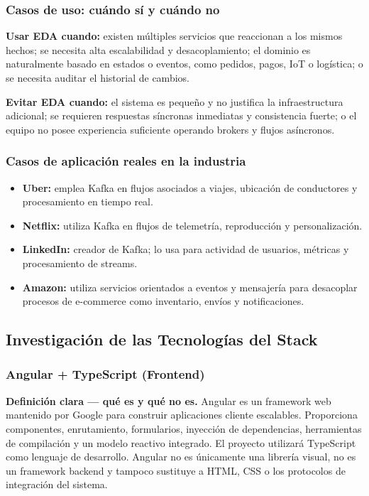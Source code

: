 \documentclass[12pt,a4paper]{article}
\begin{document}
\subsubsection{Casos de uso: cuándo sí y cuándo no}

\textbf{Usar EDA cuando:} existen múltiples servicios que reaccionan a los mismos hechos; se necesita alta escalabilidad y desacoplamiento; el dominio es naturalmente basado en estados o eventos, como pedidos, pagos, IoT o logística; o se necesita auditar el historial de cambios.

\textbf{Evitar EDA cuando:} el sistema es pequeño y no justifica la infraestructura adicional; se requieren respuestas síncronas inmediatas y consistencia fuerte; o el equipo no posee experiencia suficiente operando brokers y flujos asíncronos.

\subsubsection{Casos de aplicación reales en la industria}

\begin{itemize}[leftmargin=*]
    \item \textbf{Uber:} emplea Kafka en flujos asociados a viajes, ubicación de conductores y procesamiento en tiempo real.
    \item \textbf{Netflix:} utiliza Kafka en flujos de telemetría, reproducción y personalización.
    \item \textbf{LinkedIn:} creador de Kafka; lo usa para actividad de usuarios, métricas y procesamiento de streams.
    \item \textbf{Amazon:} utiliza servicios orientados a eventos y mensajería para desacoplar procesos de e-commerce como inventario, envíos y notificaciones.
\end{itemize}

\subsection{Investigación de las Tecnologías del Stack}

\subsubsection{Angular + TypeScript (Frontend)}

\textbf{Definición clara --- qué es y qué no es.} Angular es un framework web mantenido por Google para construir aplicaciones cliente escalables. Proporciona componentes, enrutamiento, formularios, inyección de dependencias, herramientas de compilación y un modelo reactivo integrado. El proyecto utilizará TypeScript como lenguaje de desarrollo. Angular no es únicamente una librería visual, no es un framework backend y tampoco sustituye a HTML, CSS o los protocolos de integración del sistema. \cite{angular-overview}
\end{document}
